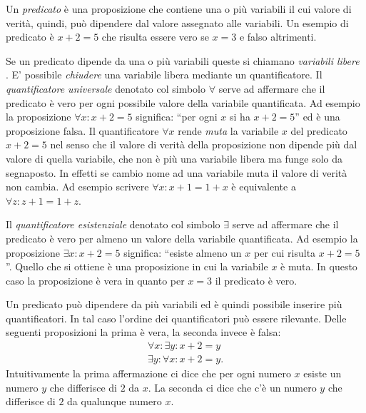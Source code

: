 Un \emph{predicato}%
%
 è una proposizione che contiene
una o più variabili il cui valore di verità, quindi,
può dipendere dal valore assegnato alle variabili.
Un esempio di predicato è $x+2=5$ che risulta essere vero se $x=3$
e falso altrimenti.

Se un predicato dipende da una o più variabili queste
si chiamano \emph{variabili libere}%
%
. E' possibile
\emph{chiudere} una variabile libera mediante un quantificatore.
Il \emph{quantificatore universale}%
%
 denotato col simbolo
$\forall$ serve ad affermare che il predicato è vero
per ogni possibile valore della variabile quantificata.
Ad esempio la proposizione $\forall x\colon x+2=5$ significa:
``per ogni $x$ si ha $x+2=5$'' ed è una proposizione falsa.
Il quantificatore $\forall x$ rende \emph{muta} la variabile
$x$ del predicato $x+2=5$ nel senso che il valore di verità 
della proposizione
non dipende più dal valore di quella variabile, che non è
più una variabile libera ma funge solo da segnaposto.
In effetti se cambio nome ad una variabile muta il valore 
di verità non cambia. Ad esempio scrivere $\forall x\colon x+1=1+x$
è equivalente a $\forall z\colon z+1=1+z$.

Il \emph{quantificatore esistenziale}%
%
 denotato col simbolo
$\exists$ serve ad affermare che il predicato è vero per
almeno un valore della variabile quantificata.
Ad esempio la proposizione $\exists x\colon x+2=5$ significa:
``esiste almeno un $x$ per cui risulta $x+2=5$''.
Quello che si ottiene è una proposizione in cui la variabile
$x$ è muta. In questo caso la proposizione è vera in quanto
per $x=3$ il predicato è vero.

Un predicato può dipendere da più variabili ed è quindi
possibile inserire più quantificatori. In tal caso l'ordine
dei quantificatori può essere rilevante.
Delle seguenti proposizioni la prima è vera, la seconda
invece è falsa:
\begin{gather*}
\forall x\colon \exists y\colon x+2=y \\
\exists y\colon \forall x\colon x+2=y.
\end{gather*}
Intuitivamente la prima affermazione ci dice che per ogni numero $x$ 
esiste un numero $y$ che differisce di $2$ da $x$.
La seconda ci dice che c'è un numero $y$ che differisce di $2$ 
da qualunque numero $x$.

